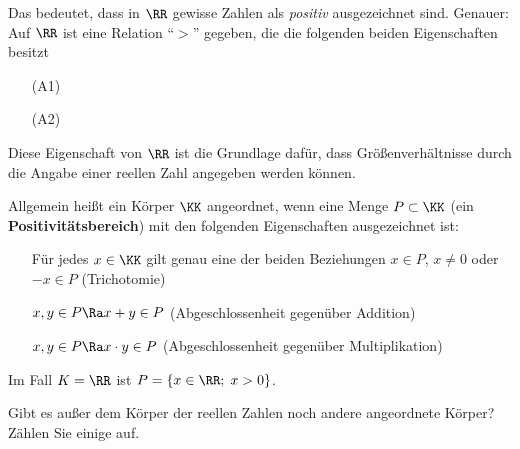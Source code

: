 \begin{antwort}
  Das bedeutet, dass in $\RR$ gewisse Zahlen als \textit{positiv} ausgezeichnet 
  sind. Genauer: Auf $\RR$ ist eine Relation "`$>$"' gegeben, die die 
  folgenden beiden Eigenschaften besitzt
  \begin{itemize}[3mm]
  \item[(A1)] 
  \item[(A2)] 
  \end{itemize}
  Diese Eigenschaft von $\RR$ ist die Grundlage dafür, 
  dass Größenverhältnisse durch die Angabe einer reellen 
  Zahl angegeben werden können. 

  \medskip
  Allgemein heißt ein Körper $\KK$ angeordnet, 
  wenn eine Menge $P\subset \KK$ (ein 
  \textbf{Positivitätsbereich}) mit den folgenden 
  Eigenschaften ausgezeichnet ist:
  \begin{itemize}
  \item[\desc{1}] Für jedes $x\in\KK$ gilt genau eine der beiden Beziehungen $x\in P$, $x\not=0$ oder $-x\in P$ (Trichotomie)
  \item[\desc{2}] $x,y \in P \Ra x+y \in P$ (Abgeschlossenheit gegenüber Addition)
  \item[\desc{3}] $x,y \in P \Ra x\cdot y \in P$ (Abgeschlossenheit gegenüber Multiplikation)
  \end{itemize}
  Im Fall $K=\RR$ ist $P=\{x\in\RR;\; x>0\}$.\AntEnd

\end{antwort}





\begin{frage} 
  \label{rationalefunktionen}
  Gibt es außer dem Körper der reellen Zahlen noch 
  andere angeordnete Körper? Zählen Sie einige auf.
\end{frage}

